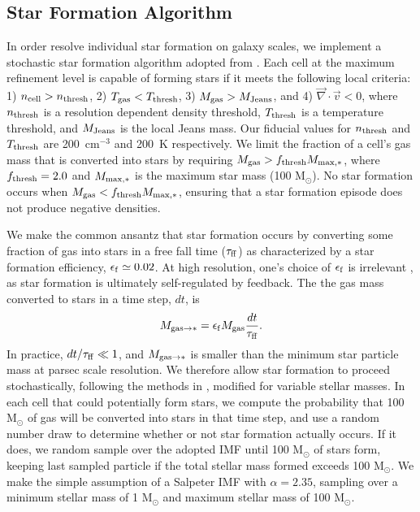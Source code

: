 \documentclass[twocolumn]{aastex61}
\begin{document}
\subsection{Star Formation Algorithm}
\label{sec:star formation}
In order resolve individual star formation on galaxy scales, we implement a stochastic star formation algorithm adopted from \cite{Goldbaum2015,Goldbaum2016}. Each cell at the maximum refinement level is capable of forming stars if it meets the following local criteria: 1) $n_{\rm cell} > n_{\rm thresh}$, 2) $T_{\rm gas} < T_{\rm thresh}$, 3) $M_{\rm gas} > M_{\rm Jeans}$, and 4) $\vec{\nabla} \cdot \vec{v} < 0$, where $n_{\rm thresh}$ is a resolution dependent density threshold, $T_{\rm thresh}$ is a temperature threshold, and $M_{\rm Jeans}$ is the local Jeans mass. Our fiducial values for $n_{\rm thresh}$ and $T_{\rm thresh}$ are 200~cm$^{-3}$ and 200~K respectively. We limit the fraction of a cell's gas mass that is converted into stars by requiring $M_{\rm gas} > f_{\rm thresh} M_{\rm max,*}$, where $f_{\rm thresh} = 2.0 $ and $M_{\rm max,*}$ is the maximum star mass (100 M$_{\odot}$). No star formation occurs when $M_{\rm gas} < f_{\rm thresh} M_{\rm max,*}$, ensuring that a star formation episode does not produce negative densities.

We make the common ansantz that star formation occurs by converting some fraction of gas into stars in a free fall time ($\tau_{\rm ff}$) as characterized by a star formation efficiency, $\epsilon_{\rm f} \simeq 0.02$. At high resolution, one's choice of $\epsilon_{\rm f}$ is irrelevant \citep{Orr2017, FIRE2}, as star formation is ultimately self-regulated by feedback.
The the gas mass converted to stars in a time step, $dt$, is
\begin{equation}
M_{ {\rm gas} \to *} = \epsilon_{\rm f} M_{\rm gas} \frac{dt}{\tau_{\rm ff}}.
\end{equation}
In practice, $dt/\tau_{\rm ff} \ll 1$, and $M_{ {\rm gas} \to *}$ is smaller than the minimum star particle mass at parsec scale resolution. We therefore allow star formation to proceed stochastically, following the methods in \cite{Goldbaum2015, Goldbaum2016}, modified for variable stellar masses. In each cell that could potentially form stars, we compute the probability that 100 M$_{\odot}$ of gas will be converted into stars in that time step, and use a random number draw to determine whether or not star formation actually occurs. If it does, we random sample over the adopted IMF until 100 M$_{\odot}$ of stars form, keeping last sampled particle if the total stellar mass formed exceeds 100 M$_{\odot}$. We make the simple assumption of a Salpeter IMF \citep{Salpeter1955} with $\alpha = 2.35$, sampling over a minimum stellar mass of 1 M$_{\odot}$ and maximum stellar mass of 100 M$_{\odot}$. 
\end{document}
